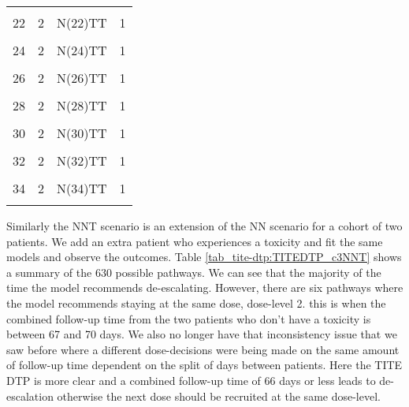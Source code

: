 \begin{table}[H]
{\begin{tabular}[t]{cccc}
			\cellcolor{gray!6}{21} & \cellcolor{gray!6}{2} & \cellcolor{gray!6}{N(21)TT} & \cellcolor{gray!6}{1}\\
			22 & 2 & N(22)TT & 1\\
			\cellcolor{gray!6}{23} & \cellcolor{gray!6}{2} & \cellcolor{gray!6}{N(23)TT} & \cellcolor{gray!6}{1}\\
			24 & 2 & N(24)TT & 1\\
			\cellcolor{gray!6}{25} & \cellcolor{gray!6}{2} & \cellcolor{gray!6}{N(25)TT} & \cellcolor{gray!6}{1}\\
			26 & 2 & N(26)TT & 1\\
			\cellcolor{gray!6}{27} & \cellcolor{gray!6}{2} & \cellcolor{gray!6}{N(27)TT} & \cellcolor{gray!6}{1}\\
			28 & 2 & N(28)TT & 1\\
			\cellcolor{gray!6}{29} & \cellcolor{gray!6}{2} & \cellcolor{gray!6}{N(29)TT} & \cellcolor{gray!6}{1}\\
			30 & 2 & N(30)TT & 1\\
			\cellcolor{gray!6}{31} & \cellcolor{gray!6}{2} & \cellcolor{gray!6}{N(31)TT} & \cellcolor{gray!6}{1}\\
			32 & 2 & N(32)TT & 1\\
			\cellcolor{gray!6}{33} & \cellcolor{gray!6}{2} & \cellcolor{gray!6}{N(33)TT} & \cellcolor{gray!6}{1}\\
			34 & 2 & N(34)TT & 1\\
			\cellcolor{gray!6}{35} & \cellcolor{gray!6}{2} & \cellcolor{gray!6}{NTT} & \cellcolor{gray!6}{1}\\
			\bottomrule
	\end{tabular}}
\end{table}

Similarly the NNT scenario is an extension of the NN scenario for a cohort of two patients. We add an extra patient who experiences a toxicity and fit the same models and observe the outcomes. Table \ref{tab_tite-dtp:TITEDTP_c3NNT} shows a summary of the 630 possible pathways. We can see that the majority of the time the model recommends de-escalating. However, there are six pathways where the model recommends staying at the same dose, dose-level 2. this is when the combined follow-up time from the two patients who don't have a toxicity is between 67 and 70 days. We also no longer have that inconsistency issue that we saw before where a different dose-decisions were being made on the same amount of follow-up time dependent on the split of days between patients. Here the TITE DTP is more clear and a combined follow-up time of 66 days or less leads to de-escalation otherwise the next dose should be recruited at the same dose-level.


